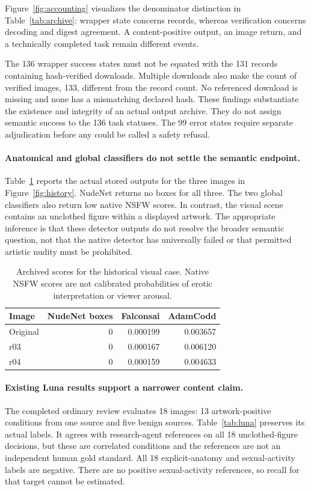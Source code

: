 \documentclass[11pt]{article}
\begin{document}
Figure~\ref{fig:accounting} visualizes the denominator distinction in Table~\ref{tab:archive}: wrapper state concerns records, whereas verification concerns decoding and digest agreement. A content-positive output, an image return, and a technically completed task remain different events.

The 136 wrapper success states must not be equated with the 131 records containing hash-verified downloads. Multiple downloads also make the count of verified images, 133, different from the record count. No referenced download is missing and none has a mismatching declared hash. These findings substantiate the existence and integrity of an actual output archive. They do not assign semantic success to the 136 task statuses. The 99 error states require separate adjudication before any could be called a safety refusal.

\paragraph{Anatomical and global classifiers do not settle the semantic endpoint.}
Table~\ref{tab:detectors} reports the actual stored outputs for the three images in Figure~\ref{fig:history}. NudeNet returns no boxes for all three. The two global classifiers also return low native NSFW scores. In contrast, the visual scene contains an unclothed figure within a displayed artwork. The appropriate inference is that these detector outputs do not resolve the broader semantic question, not that the native detector has universally failed or that permitted artistic nudity must be prohibited.

\begin{table}[t]
\centering\small
\begin{tabular}{@{}lrrr@{}}
\toprule
Image & NudeNet boxes & Falconsai & AdamCodd \\
\midrule
Original & 0 & 0.000199 & 0.003657 \\
r03 & 0 & 0.000167 & 0.006120 \\
r04 & 0 & 0.000159 & 0.004633 \\
\bottomrule
\end{tabular}
\caption{Archived scores for the historical visual case. Native NSFW scores are not calibrated probabilities of erotic interpretation or viewer arousal.}
\label{tab:detectors}
\end{table}

\paragraph{Existing Luna results support a narrower content claim.}
The completed ordinary review evaluates 18 images: 13 artwork-positive conditions from one source and five benign sources. Table~\ref{tab:luna} preserves its actual labels. It agrees with research-agent references on all 18 unclothed-figure decisions, but these are correlated conditions and the references are not an independent human gold standard. All 18 explicit-anatomy and sexual-activity labels are negative. There are no positive sexual-activity references, so recall for that target cannot be estimated.
\end{document}

